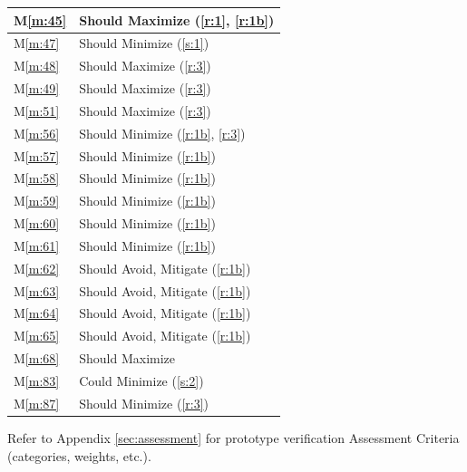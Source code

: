 \documentclass{report}
\newcommand{\mref}[1]{M\ref{#1}}
\begin{document}
\begin{tabular}{|l|p{14.35cm}|}
    \hline
    \mref{m:45} & Should Maximize \hfill (\ref{r:1}, \ref{r:1b}) \\
    \hline
    \mref{m:47} & Should Minimize \hfill (\ref{s:1}) \\
    \hline
    \mref{m:48} & Should Maximize \hfill (\ref{r:3}) \\
    \hline
    \mref{m:49} & Should Maximize \hfill (\ref{r:3}) \\
    \hline
    \mref{m:51} & Should Maximize \hfill (\ref{r:3}) \\
    \hline
    \mref{m:56} & Should Minimize \hfill (\ref{r:1b}, \ref{r:3}) \\
    \hline
    \mref{m:57} & Should Minimize \hfill (\ref{r:1b}) \\
    \hline
    \mref{m:58} & Should Minimize \hfill (\ref{r:1b}) \\
    \hline
    \mref{m:59} & Should Minimize \hfill (\ref{r:1b}) \\
    \hline
    \mref{m:60} & Should Minimize \hfill (\ref{r:1b}) \\
    \hline
    \mref{m:61} & Should Minimize \hfill (\ref{r:1b}) \\
    \hline
    \mref{m:62} & Should Avoid, Mitigate \hfill (\ref{r:1b}) \\
    \hline
    \mref{m:63} & Should Avoid, Mitigate \hfill (\ref{r:1b}) \\
    \hline
    \mref{m:64} & Should Avoid, Mitigate \hfill (\ref{r:1b}) \\
    \hline
    \mref{m:65} & Should Avoid, Mitigate \hfill (\ref{r:1b}) \\
    \hline
    \mref{m:68} & Should Maximize \hfill \cite{applicantguide} \\
    \hline
    \mref{m:83} & Could Minimize \hfill (\ref{s:2}) \\
    \hline
    \mref{m:87} & Should Minimize \hfill (\ref{r:3}) \\
    \hline
\end{tabular}

Refer to Appendix \ref{sec:assessment} for prototype verification Assessment Criteria (categories, weights, etc.).
\end{document}
